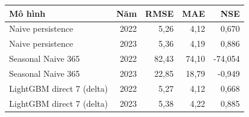\begin{tabular}{lrrrr}
\toprule
Mô hình & Năm & RMSE & MAE & NSE \\
\midrule
Naive persistence & 2022 & 5{,}26 & 4{,}12 & 0{,}670 \\
Naive persistence & 2023 & 5{,}36 & 4{,}19 & 0{,}886 \\
Seasonal Naive 365 & 2022 & 82{,}43 & 74{,}10 & -74{,}054 \\
Seasonal Naive 365 & 2023 & 22{,}85 & 18{,}79 & -0{,}949 \\
LightGBM direct 7 (delta) & 2022 & 5{,}27 & 4{,}12 & 0{,}668 \\
LightGBM direct 7 (delta) & 2023 & 5{,}38 & 4{,}22 & 0{,}885 \\
\bottomrule
\end{tabular}
